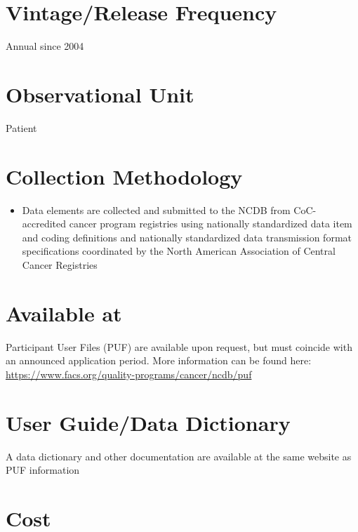 \documentclass[
]{book}
\providecommand{\tightlist}{%
  \setlength{\itemsep}{0pt}\setlength{\parskip}{0pt}}
\begin{document}
\hypertarget{vintagerelease-frequency-44}{%
\section{Vintage/Release Frequency}\label{vintagerelease-frequency-44}}

Annual since 2004

\hypertarget{observational-unit-44}{%
\section{Observational Unit}\label{observational-unit-44}}

Patient

\hypertarget{collection-methodology-44}{%
\section{Collection Methodology}\label{collection-methodology-44}}

\begin{itemize}
\tightlist
\item
  Data elements are collected and submitted to the NCDB from CoC-accredited cancer program registries using nationally standardized data item and coding definitions and nationally standardized data transmission format specifications coordinated by the North American Association of Central Cancer Registries
\end{itemize}

\hypertarget{available-at-44}{%
\section{Available at}\label{available-at-44}}

Participant User Files (PUF) are available upon request, but must coincide with an announced application period. More information can be found here: \url{https://www.facs.org/quality-programs/cancer/ncdb/puf}

\hypertarget{user-guidedata-dictionary-44}{%
\section{User Guide/Data Dictionary}\label{user-guidedata-dictionary-44}}

A data dictionary and other documentation are available at the same website as PUF information

\hypertarget{cost-44}{%
\section{Cost}\label{cost-44}}
\end{document}
